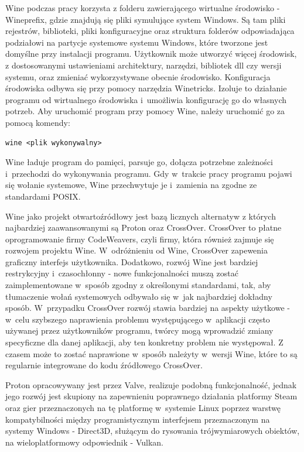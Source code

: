 Wine podczas pracy korzysta z folderu zawierającego wirtualne środowisko - Wineprefix\cite{wineprefix}, gdzie znajdują się pliki symulujące system Windows. Są tam pliki rejestrów, biblioteki, pliki konfiguracyjne oraz struktura folderów odpowiadająca podziałowi na partycje systemowe systemu Windows, które tworzone jest domyślne przy instalacji programu. Użytkownik może utworzyć więcej środowisk, z dostosowanymi ustawieniami architektury, narzędzi, bibliotek dll czy wersji systemu, oraz zmieniać wykorzystywane obecnie środowisko. Konfiguracja środowiska odbywa się przy pomocy narzędzia Winetricks\cite{winetricks}. Izoluje to działanie programu od wirtualnego środowiska i~umożliwia konfigurację go do własnych potrzeb. Aby uruchomić program przy pomocy Wine, należy uruchomić go za pomocą komendy:
\begin{verbatim}
wine <plik wykonywalny>
\end{verbatim} Wine ładuje program do pamięci, parsuje go, dołącza potrzebne zależności i~przechodzi do wykonywania programu. Gdy w~trakcie pracy programu pojawi się wołanie systemowe, Wine przechwytuje je i~zamienia na zgodne ze standardami POSIX. 

Wine jako projekt otwartoźródłowy jest bazą licznych alternatyw\cite{wineBasedProjects} z których najbardziej zaawansowanymi są Proton\cite{proton} oraz CrossOver\cite{crossover}. CrossOver to płatne oprogramowanie firmy CodeWeavers, czyli firmy, która również zajmuje się rozwojem projektu Wine. W~odróżnieniu od Wine, CrossOver zapewenia graficzny interfejs użytkownika. Dodatkowo, rozwój Wine jest bardziej restrykcyjny i~czasochłonny - nowe funkcjonalności muszą zostać zaimplementowane w~sposób zgodny z określonymi standardami, tak, aby tłumaczenie wołań systemowych odbywało się w~jak najbardziej dokładny sposób. W~przypadku CrossOver rozwój stawia bardziej na aspekty użytkowe - w~celu szybszego naprawienia problemu występującego w~aplikacji często używanej przez użytkowników programu, twórcy mogą wprowadzić zmiany specyficzne dla danej aplikacji, aby ten konkretny problem nie występował. Z czasem może to zostać naprawione w~sposób należyty w~wersji Wine, które to są regularnie integrowane do kodu źródłowego CrossOver.

Proton opracowywany jest przez Valve, realizuje podobną funkcjonalność, jednak jego rozwój jest skupiony na zapewnieniu poprawnego działania platformy Steam oraz gier przeznaczonych na tę platformę w~systemie Linux poprzez warstwę kompatybilności między programistycznym interfejsem przeznaczonym na systemy Windows - Direct3D, służącym do rysowania trójwymiarowych obiektów, na wieloplatformowy odpowiednik - Vulkan.

